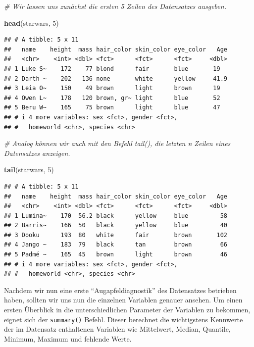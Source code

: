 \documentclass[
  ngerman,
]{book}
\newenvironment{Shaded}{\begin{snugshade}}{\end{snugshade}}
\newcommand{\CommentTok}[1]{\textcolor[rgb]{0.56,0.35,0.01}{\textit{#1}}}
\newcommand{\DecValTok}[1]{\textcolor[rgb]{0.00,0.00,0.81}{#1}}
\newcommand{\FunctionTok}[1]{\textcolor[rgb]{0.13,0.29,0.53}{\textbf{#1}}}
\newcommand{\NormalTok}[1]{#1}
\begin{document}
\begin{Shaded}
\begin{Highlighting}[]
\CommentTok{\# Wir lassen uns zunächst die ersten 5 Zeilen des Datensatzes ausgeben. }

\FunctionTok{head}\NormalTok{(starwars, }\DecValTok{5}\NormalTok{)}
\end{Highlighting}
\end{Shaded}

\begin{verbatim}
## # A tibble: 5 x 11
##   name    height  mass hair_color skin_color eye_color   Age
##   <chr>    <int> <dbl> <fct>      <fct>      <fct>     <dbl>
## 1 Luke S~    172    77 blond      fair       blue       19  
## 2 Darth ~    202   136 none       white      yellow     41.9
## 3 Leia O~    150    49 brown      light      brown      19  
## 4 Owen L~    178   120 brown, gr~ light      blue       52  
## 5 Beru W~    165    75 brown      light      blue       47  
## # i 4 more variables: sex <fct>, gender <fct>,
## #   homeworld <chr>, species <chr>
\end{verbatim}

\begin{Shaded}
\begin{Highlighting}[]
\CommentTok{\# Analog können wir auch mit den Befehl tail(), die letzten n Zeilen eines Datensatzes anzeigen.}

\FunctionTok{tail}\NormalTok{(starwars, }\DecValTok{5}\NormalTok{)}
\end{Highlighting}
\end{Shaded}

\begin{verbatim}
## # A tibble: 5 x 11
##   name    height  mass hair_color skin_color eye_color   Age
##   <chr>    <int> <dbl> <fct>      <fct>      <fct>     <dbl>
## 1 Lumina~    170  56.2 black      yellow     blue         58
## 2 Barris~    166  50   black      yellow     blue         40
## 3 Dooku      193  80   white      fair       brown       102
## 4 Jango ~    183  79   black      tan        brown        66
## 5 Padmé ~    165  45   brown      light      brown        46
## # i 4 more variables: sex <fct>, gender <fct>,
## #   homeworld <chr>, species <chr>
\end{verbatim}

Nachdem wir nun eine erste ``Augapfeldiagnostik'' des Datensatzes betrieben haben, sollten wir uns nun die einzelnen Variablen genauer ansehen. Um einen ersten Überblick in die unterschiedlichen Parameter der Variablen zu bekommen, eignet sich der \texttt{summary()} Befehl. Dieser berechnet die wichtigstens Kennwerte der im Datensatz enthaltenen Variablen wie Mittelwert, Median, Quantile, Minimum, Maximum und fehlende Werte.
\end{document}
